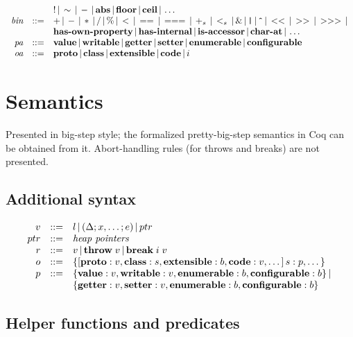 \documentclass[draft, 10pt]{article}
\newcommand{\expr}[0]{e}
\newcommand{\var}[0]{x}
\newcommand{\lit}[0]{l}
\newcommand{\bool}[0]{b}
\newcommand{\str}[0]{s}
\newcommand{\id}[0]{i}
\newcommand{\binop}[0]{\textit{bin}}
\newcommand{\pattr}[0]{\textit{pa}}
\newcommand{\oattr}[0]{\textit{oa}}
\newcommand{\pavalue}[0]{\textbf{value}}
\newcommand{\pawritable}[0]{\textbf{writable}}
\newcommand{\paget}[0]{\textbf{getter}}
\newcommand{\paset}[0]{\textbf{setter}}
\newcommand{\paenum}[0]{\textbf{enumerable}}
\newcommand{\paconfig}[0]{\textbf{configurable}}
\newcommand{\oaproto}[0]{\textbf{proto}}
\newcommand{\oaclass}[0]{\textbf{class}}
\newcommand{\oaextens}[0]{\textbf{extensible}}
\newcommand{\oacode}[0]{\textbf{code}}
\newcommand{\brk}[2]{\textbf{break} \thickspace #1 \thickspace #2}
\newcommand{\throw}[1]{\textbf{throw} \thickspace #1}
\newcommand{\bnfsep}[0]{\thinspace | \thinspace}
\newcommand{\opabs}[0]{\textbf{abs}}
\newcommand{\opfloor}[0]{\textbf{floor}}
\newcommand{\opceil}[0]{\textbf{ceil}}
\newcommand{\opnot}[0]{!}
\newcommand{\opbnot}[0]{\sim}
\newcommand{\opneg}[0]{-}
\newcommand{\ophasprop}[0]{\textbf{has-own-property}}
\newcommand{\opisaccessor}[0]{\textbf{is-accessor}}
\newcommand{\opcharat}[0]{\textbf{char-at}}
\newcommand{\opband}[0]{\&}
\newcommand{\opbor}[0]{\texttt{|}}
\newcommand{\opbxor}[0]{\texttt{\^{}}}
\newcommand{\opshiftl}[0]{<<}
\newcommand{\opshiftr}[0]{>>}
\newcommand{\opzfshiftr}[0]{>>>}
\newcommand{\opadd}[0]{+}
\newcommand{\opsub}[0]{-}
\newcommand{\opmul}[0]{*}
\newcommand{\opdiv}[0]{/}
\newcommand{\opmod}[0]{\%}
\newcommand{\oplt}[0]{<}
\newcommand{\opstxeq}[0]{==}
\newcommand{\opsamevalue}[0]{===}
\newcommand{\ophasinternal}[0]{\textbf{has-internal}}
\newcommand{\opstrplus}[0]{+_{\str}}
\newcommand{\opstrlt}[0]{<_{\str}}
\newcommand{\varenv}[0]{\Delta}
\newcommand{\closure}[3]{(#1; #2; #3)}
\newcommand{\bigret}[0]{r}
\newcommand{\bigval}[0]{v}
\newcommand{\oprop}[0]{p}
\newcommand{\obj}[0]{o}
\newcommand{\objlit}[2]{\{[#1]\thinspace#2\}}
\newcommand{\bigthrow}[1]{\throw{#1}}
\newcommand{\bigbrk}[2]{\brk{#1}{#2}}
\newcommand{\heapptr}{ptr}
\begin{document}
\[\begin{array}{rcl}
      && \opnot \bnfsep \opbnot \bnfsep \opneg \bnfsep \opabs \bnfsep \opfloor \bnfsep \opceil \bnfsep  \dots \\
\binop & ::= & \opadd \bnfsep \opsub \bnfsep \opmul \bnfsep \opdiv \bnfsep \opmod \bnfsep \oplt \bnfsep \opstxeq \bnfsep \opsamevalue \bnfsep \opstrplus \bnfsep \opstrlt \bnfsep \opband \bnfsep \opbor \bnfsep \opbxor \bnfsep \opshiftl \bnfsep \opshiftr \bnfsep \opzfshiftr \bnfsep \\
&& \ophasprop \bnfsep \ophasinternal \bnfsep \opisaccessor \bnfsep \opcharat \bnfsep \dots \\
\pattr & ::= & \pavalue \bnfsep \pawritable \bnfsep \paget \bnfsep \paset \bnfsep
               \paenum \bnfsep \paconfig \\
\oattr & ::= & \oaproto \bnfsep \oaclass \bnfsep \oaextens \bnfsep \oacode \bnfsep \id
\end{array}
\]

\section{Semantics}

Presented in big-step style; the formalized pretty-big-step semantics in Coq can be obtained
from it. Abort-handling rules (for throws and breaks) are not presented.

\subsection{Additional syntax}

\[
\begin{array}{rcl}
\bigval & ::= & \lit \bnfsep \closure{\varenv}{\var, \dots}{\expr} \bnfsep \heapptr \\
\heapptr & ::= & \textit{heap pointers} \\
\bigret & ::= & \bigval \bnfsep \bigthrow{\bigval} \bnfsep \bigbrk{\id}{\bigval} \\
\obj & ::= & \objlit{\oaproto : \bigval, \oaclass : \str, \oaextens : \bool, \oacode : \bigval, \dots}{\str : \oprop, \dots} \\
\oprop & ::= & \{\pavalue : \bigval, \pawritable : \bigval, \paenum : \bool, \paconfig : \bool \} \bnfsep \\
           & & \{\paget : \bigval, \paset : \bigval, \paenum : \bool, \paconfig : \bool \} \\
\end{array}
\]

\subsection{Helper functions and predicates}
\end{document}
